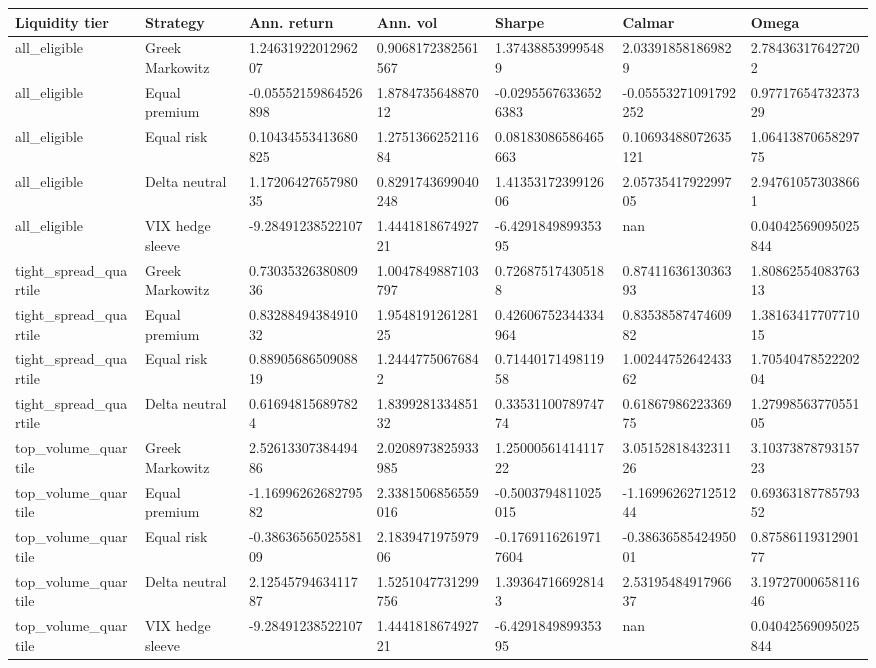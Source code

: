 \begin{tabular}{lllllll}
\toprule
Liquidity tier & Strategy & Ann. return & Ann. vol & Sharpe & Calmar & Omega \\
\midrule
all\_eligible & Greek Markowitz & 1.2463192201296207 & 0.9068172382561567 & 1.374388539995489 & 2.033918581869829 & 2.784363176427202 \\
all\_eligible & Equal premium & -0.05552159864526898 & 1.878473564887012 & -0.02955676336526383 & -0.05553271091792252 & 0.9771765473237329 \\
all\_eligible & Equal risk & 0.10434553413680825 & 1.275136625211684 & 0.08183086586465663 & 0.10693488072635121 & 1.0641387065829775 \\
all\_eligible & Delta neutral & 1.1720642765798035 & 0.8291743699040248 & 1.4135317239912606 & 2.0573541792299705 & 2.947610573038661 \\
all\_eligible & VIX hedge sleeve & -9.28491238522107 & 1.444181867492721 & -6.429184989935395 & nan & 0.04042569095025844 \\
tight\_spread\_quartile & Greek Markowitz & 0.7303532638080936 & 1.0047849887103797 & 0.726875174305188 & 0.8741163613036393 & 1.8086255408376313 \\
tight\_spread\_quartile & Equal premium & 0.8328849438491032 & 1.954819126128125 & 0.42606752344334964 & 0.8353858747460982 & 1.3816341770771015 \\
tight\_spread\_quartile & Equal risk & 0.8890568650908819 & 1.24447750676842 & 0.7144017149811958 & 1.0024475264243362 & 1.7054047852220204 \\
tight\_spread\_quartile & Delta neutral & 0.616948156897824 & 1.839928133485132 & 0.3353110078974774 & 0.6186798622336975 & 1.2799856377055105 \\
top\_volume\_quartile & Greek Markowitz & 2.5261330738449486 & 2.0208973825933985 & 1.2500056141411722 & 3.0515281843231126 & 3.1037387879315723 \\
top\_volume\_quartile & Equal premium & -1.1699626268279582 & 2.3381506856559016 & -0.5003794811025015 & -1.1699626271251244 & 0.6936318778579352 \\
top\_volume\_quartile & Equal risk & -0.3863656502558109 & 2.183947197597906 & -0.17691162619717604 & -0.3863658542495001 & 0.8758611931290177 \\
top\_volume\_quartile & Delta neutral & 2.1254579463411787 & 1.5251047731299756 & 1.393647166928143 & 2.5319548491796637 & 3.1972700065811646 \\
top\_volume\_quartile & VIX hedge sleeve & -9.28491238522107 & 1.444181867492721 & -6.429184989935395 & nan & 0.04042569095025844 \\
\bottomrule
\end{tabular}
